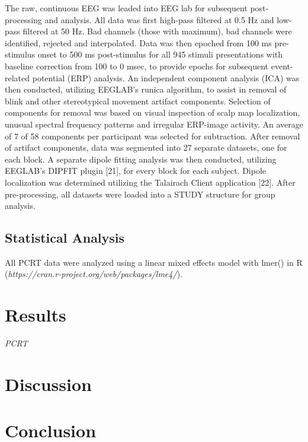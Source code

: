 The raw, continuous EEG was leaded into EEG lab \cite{delorme_eeglab:_2004} for subsequent post-processing and analysis. All data was first high-pass filtered at 0.5 Hz and low-pass filtered at 50 Hz. Bad channels (those with maximum), bad channels were identified, rejected and interpolated. Data was then epoched from 100 ms pre- stimulus onset to 500 ms post-stimulus for all 945 stimuli presentations with baseline correction from 100 to 0 msec, to provide epochs for subsequent event-related potential (ERP) analysis. An independent component analysis (ICA) was then conducted, utilizing EEGLAB’s runica algorithm, to assist in removal of blink and other stereotypical movement artifact components. Selection of components for removal was based on visual inspection of scalp map localization, unusual spectral frequency patterns and irregular ERP-image activity. An average of 7 of 58 components per participant was selected for subtraction. After removal of artifact components, data was segmented into 27 separate datasets, one for each block. A separate dipole fitting analysis was then conducted, utilizing EEGLAB’s DIPFIT plugin [21], for every block for each subject. Dipole localization was determined utilizing the Talairach Client application [22]. After pre-processing, all datasets were loaded into a STUDY structure for group analysis.

\subsection{Statistical Analysis}
All PCRT data were analyzed using a linear mixed effects model with lmer() in R (\textit{https://cran.r-project.org/web/packages/lme4/}).



\section{Results}

\textit{PCRT}








\section{Discussion}

\section{Conclusion}